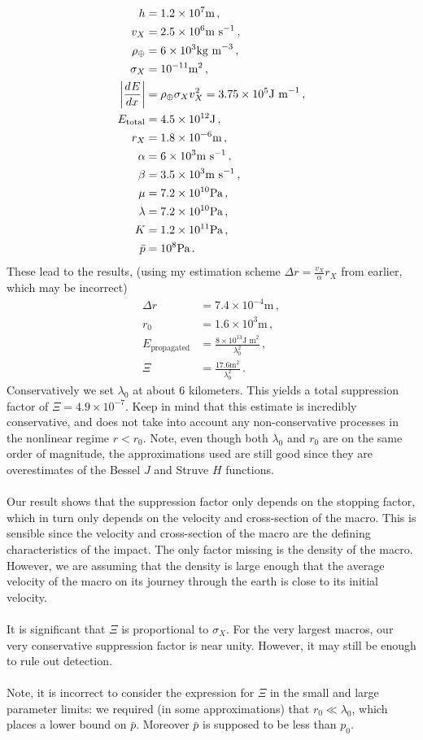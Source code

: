 \documentclass{article}
\newcommand*\te[1]{\text{#1}}
\newcommand*\f[2]{\frac{#1}{#2}}
\newcommand*\td[3]{\frac{d^{#3}#1}{d #2^{#3}}}
\begin{document}
\begin{align}
h&=1.2\times 10^7\te{m}\,,\\
v_X&=2.5\times 10^6\te{m s}^{-1}\,,\\
\rho_{\oplus}&=6\times 10^3\te{kg m}^{-3}\,,\\
\sigma_X&=10^{-11}\te{m}^2\,,\\
\abs{\td{E}{x}{}}&=\rho_{\oplus}\sigma_X v_X^2=3.75\times 10^5\te{J m}^{-1}\,,\\
E_{\te{total}}&=4.5\times 10^{12}\te{J}\,,\\
r_X&=1.8\times 10^{-6}\te{m}\,,\\
\alpha&=6\times 10^3\te{m s}^{-1}\,,\\
\beta&=3.5\times 10^{3}\te{m s}^{-1}\,,\\
\mu&=7.2\times 10^{10}\te{Pa}\,,\\
\lambda&=7.2\times 10^{10}\te{Pa}\,,\\
K&=1.2\times 10^{11}\te{Pa}\,,\\
\bar p&=10^8\te{Pa}\,.
\end{align}
These lead to the results, (using my estimation scheme $\Delta r=\f{v_X}{\alpha}r_X$ from earlier, which may be incorrect)
\begin{align}
\Delta r&=7.4\times 10^{-4}\te{m}\,,\\
r_0&=1.6\times 10^3\te{m}\,,\\
E_{\te{propagated}}&=\f{8\times 10^{13}\te{J m}^2}{\lambda_0^2}\,,\\
\Xi&=\f{17.6\te{m}^2}{\lambda_0^2}\,.
\end{align}
Conservatively we set $\lambda_0$ at about $6$ kilometers. This yields a total suppression factor of $\Xi=4.9\times 10^{-7}$. Keep in mind that this estimate is incredibly conservative, and does not take into account any non-conservative processes in the nonlinear regime $r<r_0$. Note, even though both $\lambda_0$ and $r_0$ are on the same order of magnitude, the approximations used are still good since they are overestimates of the Bessel $J$ and Struve $H$ functions.
\\\\
Our result shows that the suppression factor only depends on the stopping factor, which in turn only depends on the velocity and cross-section of the macro. This is sensible since the velocity and cross-section of the macro are the defining characteristics of the impact. The only factor missing is the density of the macro. However, we are assuming that the density is large enough that the average velocity of the macro on its journey through the earth is close to its initial velocity.
\\\\
It is significant that $\Xi$ is proportional to $\sigma_X$. For the very largest macros, our very conservative suppression factor is near unity. However, it may still be enough to rule out detection.
\\\\
Note, it is incorrect to consider the expression for $\Xi$ in the small and large parameter limits: we required (in some approximations) that $r_0\ll \lambda_0$, which places a lower bound on $\bar p$. Moreover $\bar p$ is supposed to be less than $p_0$.
\pagebreak
\end{document}

